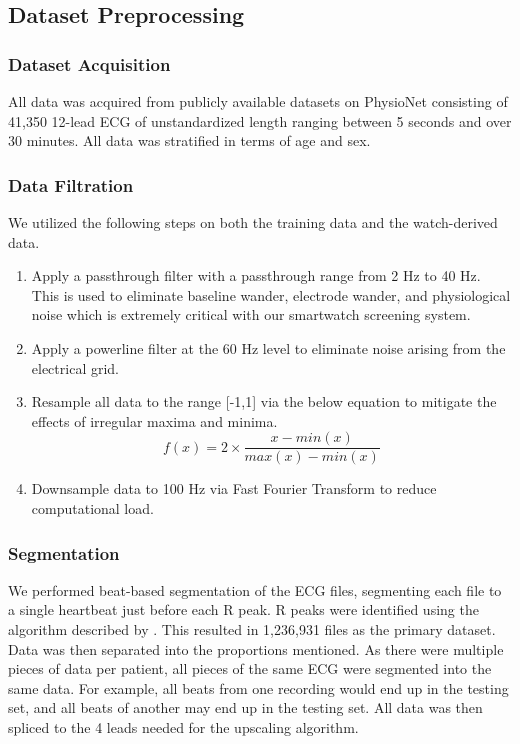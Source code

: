 \documentclass[
	a4paper, 
	10pt, 
	twoside, 
]{LTJournalArticle}
\begin{document}
\subsection{Dataset Preprocessing}
\subsubsection{Dataset Acquisition}
All data was acquired from publicly available datasets on PhysioNet consisting of 41,350 12-lead ECG of unstandardized length ranging between 5 seconds and over 30 minutes. All data was stratified in terms of age and sex. 
\subsubsection{Data Filtration}
We utilized the following steps on both the training data and the watch-derived data. 
\begin{enumerate}
    \item Apply a passthrough filter with a passthrough range from 2 Hz to 40 Hz. This is used to eliminate baseline wander, electrode wander, and physiological noise which is extremely critical with our smartwatch screening system. 
    \item Apply a powerline filter at the 60 Hz level to eliminate noise arising from the electrical grid. 
    \item Resample all data to the range [-1,1] via the below equation to mitigate the effects of irregular maxima and minima. 
    \begin{equation}
        f(x)=2\times \frac{x-min(x)}{max(x)-min(x)}
    \end{equation}
    \item Downsample data to 100 Hz via Fast Fourier Transform to reduce computational load. 
\end{enumerate}

\subsubsection{Segmentation}
We performed beat-based segmentation of the ECG files, segmenting each file to a single heartbeat just before each R peak. R peaks were identified using the algorithm described by \textcite{Pooyan2016}. This resulted in 1,236,931 files as the primary dataset. Data was then separated into the proportions mentioned. As there were multiple pieces of data per patient, all pieces of the same ECG were segmented into the same data. For example, all beats from one recording would end up in the testing set, and all beats of another may end up in the testing set. All data was then spliced to the 4 leads needed for the upscaling algorithm. 
\end{document}
